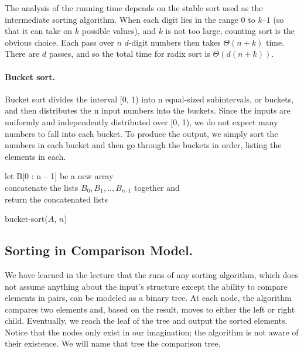 The analysis of the running time depends on the stable sort used as the intermediate sorting algorithm. When each digit lies in the range $0$ to $k – 1$ (so that it can take on $k$ possible values), and $k$ is not too large, counting sort is the obvious choice. Each pass over $n$ $d$-digit numbers then takes $\Theta(n + k)$ time. There are $d$ passes, and so the total time for radix sort is $\Theta\left(d(n + k)\right)$.

\paragraph{Bucket sort.  }
Bucket sort divides the interval [0, 1) into n equal-sized subintervals, or buckets, and then distributes the n input numbers into the buckets. Since the inputs are uniformly and independently distributed over [0, 1), we do not expect many numbers to fall into each bucket. To produce the output, we simply sort the numbers in each bucket and then go through the buckets in order, listing the elements in each.

%
  \begin{algorithm}
    	let B[0 : n – 1] be a new array \\
	\For{ $i \leftarrow [1, n]$}{
	    insert $A_{i}$ into list $B_{ \lfloor n A_{i} \rfloor} ]$
       	}
	concatenate the lists $B_{0}, B_{1}, .. , B_{n – 1}$ together and\\
	return the concatenated lists
\caption{bucket-sort($A$, $n$)}
  \end{algorithm}
%

%

\subsection{Sorting in Comparison Model.}

We have learned in the lecture that the runs of any sorting algorithm, which does not assume anything about the input's structure except the ability to compare elements in pairs, can be modeled as a binary tree. At each node, the algorithm compares two elements and, based on the result, moves to either the left or right child. Eventually, we reach the leaf of the tree and output the sorted elements. Notice that the nodes only exist in our imagination; the algorithm is not aware of their existence. We will name that tree the comparison tree.

